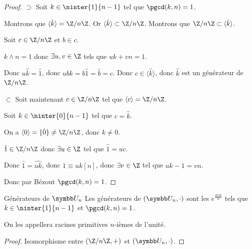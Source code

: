 
\begin{proof}
    $\supset$ Soit $k \in \ninter{1}{n-1}$ tel que $\pgcd(k, n) = 1$.

    Montrons que $\langle \hat k \rangle = \Z / n \Z$.
    Or $\langle \hat k \rangle \subset \Z/n\Z$.
    Montrons que $\Z/n\Z \subset \langle \hat k \rangle$.

    Soit $c \in \Z / n \Z$ et $b \in c$.

    $k \wedge n = 1$ donc $\exists u, v \in \Z$ tels que $uk + vn = 1$.

    Donc $u\hat k = \hat 1$, donc $ub \hat k = b \hat 1 = \hat b = c$. Donc $c \in \langle \hat k \rangle$, 
    donc $\hat k$ est un générateur de $\Z / n \Z$.

    \avspace $\subset$ Soit maintenant $c \in \Z / n \Z$ tel que $\langle c \rangle = \Z / n \Z$.

    Soit $k \in \ninter {0}{n-1}$ tel que $c = \hat k$.

    On a $\langle 0 \rangle = \{\hat 0\} \neq \Z / n \Z$, donc $k \neq 0$.

    $\hat 1 \in \Z / n \Z$ donc $\exists u \in \Z$ tel que $\hat 1 = u c$. 

    Donc $\hat 1 = \widehat{uk}$, donc $1 \equiv uk [n]$, donc $\exists v \in \Z$ tel que $uk - 1 = vn$.

    Donc par Bézout $\pgcd(k, n) = 1$.
\end{proof}

\begin{corollaire}{Générateurs de $\symbb U_n$}{}
    Les générateurs de $(\symbb U_n, \cdot)$ sont les $e^{\frac{2i\pi k} n}$ tels que 
    $k \in \ninter{1}{n-1}$ et $\pgcd(k, n) = 1$.

    On les appellera racines primitives $n$-ièmes de l'unité.
\end{corollaire}

\begin{proof}
    Isomorphisme entre $(\Z / n \Z, +)$ et $(\symbb U_n, \cdot)$.
\end{proof}

